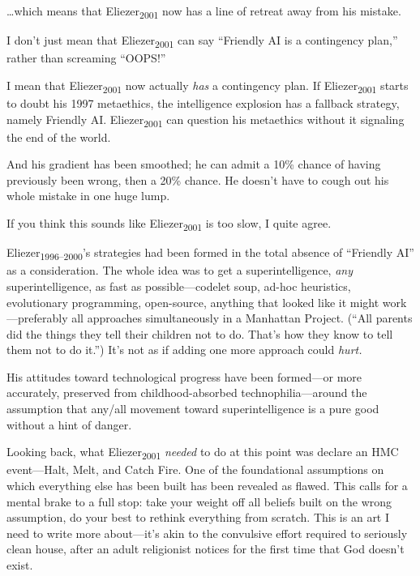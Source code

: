 {
 \ldots which means that Eliezer\textsubscript{2001} now has a line
of retreat away from his mistake.}

{
 I don't just mean that Eliezer\textsubscript{2001}
can say ``Friendly AI is a contingency
plan,'' rather than screaming
``OOPS!''}

{
 I mean that Eliezer\textsubscript{2001} now actually \textit{has}
a contingency plan. If Eliezer\textsubscript{2001} starts to doubt his
1997 metaethics, the intelligence explosion has a fallback strategy,
namely Friendly AI. Eliezer\textsubscript{2001} can question his
metaethics without it signaling the end of the world.}

{
 And his gradient has been smoothed; he can admit a 10\% chance of
having previously been wrong, then a 20\% chance. He
doesn't have to cough out his whole mistake in one huge
lump.}

{
 If you think this sounds like Eliezer\textsubscript{2001} is too
slow, I quite agree.}

{
 Eliezer\textsubscript{1996--2000}'s strategies had
been formed in the total absence of ``Friendly
AI'' as a consideration. The whole idea was to get a
superintelligence, \textit{any} superintelligence, as fast as
possible---codelet soup, ad-hoc heuristics, evolutionary programming,
open-source, anything that looked like it might work---preferably all
approaches simultaneously in a Manhattan Project.
(``All parents did the things they tell their children
not to do. That's how they know to tell them not to do
it.'') It's not as
if adding one more approach could \textit{hurt.}}

{
 His attitudes toward technological progress have been formed---or
more accurately, preserved from childhood-absorbed
technophilia---around the assumption that any/all movement toward
superintelligence is a pure good without a hint of danger.}

{
 Looking back, what Eliezer\textsubscript{2001} \textit{needed} to
do at this point was declare an HMC event---Halt, Melt, and Catch Fire.
One of the foundational assumptions on which everything else has been
built has been revealed as flawed. This calls for a mental brake to a
full stop: take your weight off all beliefs built on the wrong
assumption, do your best to rethink everything from scratch. This is an
art I need to write more about---it's akin to the
convulsive effort required to seriously clean house, after an adult
religionist notices for the first time that God doesn't
exist.}

